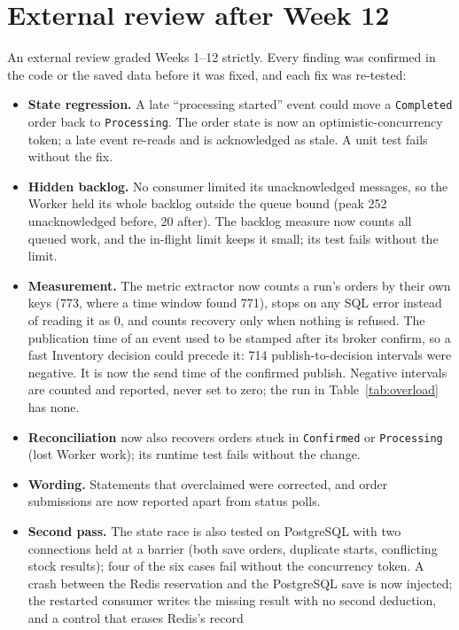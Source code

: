 \documentclass[12pt,a4paper]{article}
\begin{document}
\section{External review after Week 12}
\label{sec:review}
An external review graded Weeks 1--12 strictly. Every finding was confirmed
in the code or the saved data before it was fixed, and each fix was re-tested:
\begin{itemize}
  \item \textbf{State regression.} A late ``processing started'' event could
    move a \texttt{Completed} order back to \texttt{Processing}. The order
    state is now an optimistic-concurrency token; a late event re-reads and is
    acknowledged as stale. A unit test fails without the fix.
  \item \textbf{Hidden backlog.} No consumer limited its unacknowledged
    messages, so the Worker held its whole backlog outside the queue bound
    (peak 252 unacknowledged before, 20 after). The backlog measure now counts
    all queued work, and the in-flight limit keeps it small; its test fails
    without the limit.
  \item \textbf{Measurement.} The metric extractor now counts a run's orders
    by their own keys (773, where a time window found 771), stops on any SQL
    error instead of reading it as 0, and counts recovery only when nothing is
    refused. The publication time of an event used to be stamped after its
    broker confirm, so a fast Inventory decision could precede it: 714
    publish-to-decision intervals were negative. It is now the send time of
    the confirmed publish. Negative intervals are counted and reported, never
    set to zero; the run in Table~\ref{tab:overload} has none.
  \item \textbf{Reconciliation} now also recovers orders stuck in
    \texttt{Confirmed} or \texttt{Processing} (lost Worker work); its runtime
    test fails without the change.
  \item \textbf{Wording.} Statements that overclaimed were corrected, and
    order submissions are now reported apart from status polls.
  \item \textbf{Second pass.} The state race is also tested on PostgreSQL
    with two connections held at a barrier (both save orders, duplicate
    starts, conflicting stock results); four of the six cases fail without the
    concurrency token. A crash between the Redis reservation and the
    PostgreSQL save is now injected; the restarted consumer writes the missing
    result with no second deduction, and a control that erases Redis's record

\end{itemize}
\end{document}
